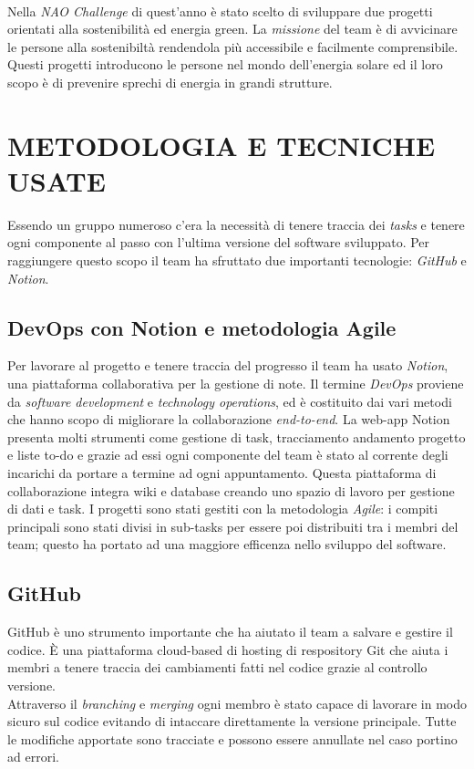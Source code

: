 \documentclass{optica-article}
\begin{document}
\begin{abstract*} 
\vspace{7pt}
\noindent
\\Nella \emph{NAO Challenge} di quest'anno è stato scelto di sviluppare due progetti orientati alla sostenibilità ed energia green. La \emph{missione} del team è di avvicinare le persone alla sostenibiltà rendendola più accessibile e facilmente comprensibile. Questi progetti introducono le persone nel mondo dell'energia solare ed il loro scopo è di prevenire sprechi di energia in grandi strutture.\\

\section{METODOLOGIA E TECNICHE USATE}\label{sec:methodology_technologies}
Essendo un gruppo numeroso c'era la necessità di tenere traccia dei \emph{tasks} e tenere ogni componente al passo con l'ultima versione del software sviluppato. Per raggiungere questo scopo il team ha sfruttato due importanti tecnologie: \emph{GitHub} e \emph{Notion}.

\subsection{DevOps con Notion e metodologia Agile}\label{sec:devops_notion}
Per lavorare al progetto e tenere traccia del progresso il team ha usato \emph{Notion}, una piattaforma collaborativa per la gestione di note. Il termine \emph{DevOps} proviene da \emph{software development} e \emph{technology operations}, ed è costituito dai vari metodi che hanno scopo di migliorare la collaborazione \emph{end-to-end}. La web-app Notion presenta molti strumenti come gestione di task, tracciamento andamento progetto e liste to-do e grazie ad essi ogni componente del team è stato al corrente degli incarichi da portare a termine ad ogni appuntamento. Questa piattaforma di collaborazione integra wiki e database creando uno spazio di lavoro per gestione di dati e task. I progetti sono stati gestiti con la metodologia \emph{Agile}: i compiti principali sono stati divisi in sub-tasks per essere poi distribuiti tra i membri del team; questo ha portato ad una maggiore efficenza nello sviluppo del software.

\subsection{GitHub}\label{sec:git_hub}
GitHub è uno strumento importante che ha aiutato il team a salvare e gestire il codice. È una piattaforma cloud-based di hosting di respository Git che aiuta i membri a tenere traccia dei cambiamenti fatti nel codice grazie al controllo versione.\\
Attraverso il \emph{branching} e \emph{merging} ogni membro è stato capace di lavorare in modo sicuro sul codice evitando di intaccare direttamente la versione principale. Tutte le modifiche apportate sono tracciate e possono essere annullate nel caso portino ad errori.


\end{abstract*}
\end{document}
